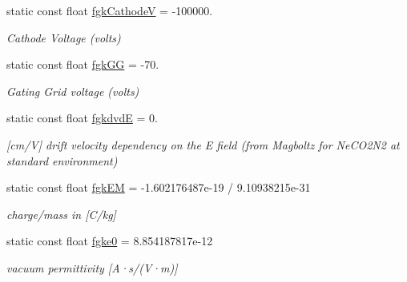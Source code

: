 \begin{DoxyCompactItemize}
static const float \hyperlink{classPoissonSolver3DCylindricalGPU_a7f5bfebf7555b8d9182a1806170a3565}{fgk\+CathodeV} = -\/100000.
\begin{DoxyCompactList}\small\item\em Cathode Voltage (volts) \end{DoxyCompactList}\item 
\hypertarget{classPoissonSolver3DCylindricalGPU_af694481902e89319c08ac59eac5e0989}{}\label{classPoissonSolver3DCylindricalGPU_af694481902e89319c08ac59eac5e0989} 
static const float \hyperlink{classPoissonSolver3DCylindricalGPU_af694481902e89319c08ac59eac5e0989}{fgk\+GG} = -\/70.
\begin{DoxyCompactList}\small\item\em Gating Grid voltage (volts) \end{DoxyCompactList}\item 
\hypertarget{classPoissonSolver3DCylindricalGPU_a8314f125dccb8e231eda4d463e7ec86a}{}\label{classPoissonSolver3DCylindricalGPU_a8314f125dccb8e231eda4d463e7ec86a} 
static const float \hyperlink{classPoissonSolver3DCylindricalGPU_a8314f125dccb8e231eda4d463e7ec86a}{fgkdvdE} = 0.
\begin{DoxyCompactList}\small\item\em \mbox{[}cm/V\mbox{]} drift velocity dependency on the E field (from Magboltz for Ne\+C\+O2\+N2 at standard environment) \end{DoxyCompactList}\item 
\hypertarget{classPoissonSolver3DCylindricalGPU_a5fa7b4543d1140a49d2ca3cc85126cfb}{}\label{classPoissonSolver3DCylindricalGPU_a5fa7b4543d1140a49d2ca3cc85126cfb} 
static const float \hyperlink{classPoissonSolver3DCylindricalGPU_a5fa7b4543d1140a49d2ca3cc85126cfb}{fgk\+EM} = -\/1.\+602176487e-\/19 / 9.\+10938215e-\/31
\begin{DoxyCompactList}\small\item\em charge/mass in \mbox{[}C/kg\mbox{]} \end{DoxyCompactList}\item 
\hypertarget{classPoissonSolver3DCylindricalGPU_ad324850ca2018294f266470a27ffff4a}{}\label{classPoissonSolver3DCylindricalGPU_ad324850ca2018294f266470a27ffff4a} 
static const float \hyperlink{classPoissonSolver3DCylindricalGPU_ad324850ca2018294f266470a27ffff4a}{fgke0} = 8.\+854187817e-\/12
\begin{DoxyCompactList}\small\item\em vacuum permittivity \mbox{[}A·s/(V·m)\mbox{]} \end{DoxyCompactList}\item 

\end{DoxyCompactItemize}
